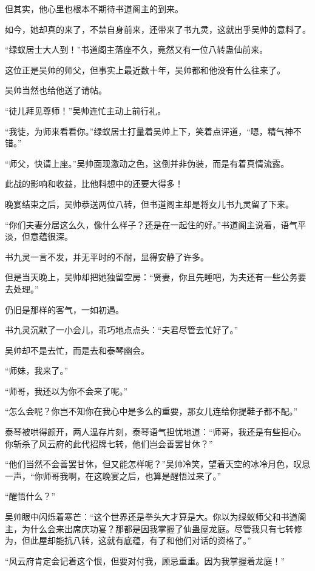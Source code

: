 \begin{this_body}
但其实，他心里也根本不期待书道阁主的到来。

如今，她却真的来了，不禁自身前来，还带来了书九灵，这就出乎吴帅的意料了。

“绿蚁居士大人到！”书道阁主落座不久，竟然又有一位八转蛊仙前来。

这位正是吴帅的师父，但事实上最近数十年，吴帅都和他没有什么往来了。

吴帅当然也给他送了请帖。

“徒儿拜见尊师！”吴帅连忙主动上前行礼。

“我徒，为师来看看你。”绿蚁居士打量着吴帅上下，笑着点评道，“嗯，精气神不错。”

“师父，快请上座。”吴帅面现激动之色，这倒并非伪装，而是有着真情流露。

此战的影响和收益，比他料想中的还要大得多！

晚宴结束之后，吴帅恭送两位八转，但书道阁主却是将女儿书九灵留了下来。

“你们夫妻分居这么久，像什么样子？还是在一起住的好。”书道阁主说着，语气平淡，但意蕴很深。

书九灵一言不发，并无平时的不耐，显得安静了许多。

但是当天晚上，吴帅却把她独留空房：“贤妻，你且先睡吧，为夫还有一些公务要去处理。”

仍旧是那样的客气，一如初遇。

书九灵沉默了一小会儿，乖巧地点点头：“夫君尽管去忙好了。”

吴帅却不是去忙，而是去和泰琴幽会。

“师妹，我来了。”

“师哥，我还以为你不会来了呢。”

“怎么会呢？你岂不知你在我心中是多么的重要，那女儿连给你提鞋子都不配。”

泰琴被哄得颜开，两人温存片刻，泰琴语气担忧地道：“师哥，我还是有些担心。你斩杀了风云府的此代招牌七转，他们岂会善罢甘休？”

“他们当然不会善罢甘休，但又能怎样呢？”吴帅冷笑，望着天空的冰冷月色，叹息一声，“你师哥我啊，在这晚宴之后，也算是醒悟过来了。”

“醒悟什么？”

吴帅眼中闪烁着寒芒：“这个世界还是拳头大才算是大。你以为绿蚁师父和书道阁主，为什么会来出席庆功宴？那都是因我掌握了仙蛊屋龙庭。尽管我只有七转修为，但此屋却能抗八转，这就有底蕴，有了和他们对话的资格了。”

“风云府肯定会记着这个恨，但要对付我，顾忌重重。因为我掌握着龙庭！”


\end{this_body}
